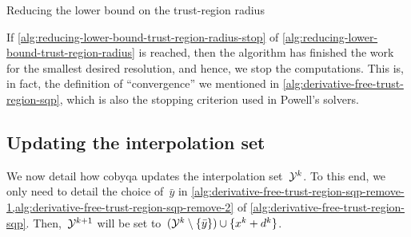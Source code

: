 \begin{algorithm}
    \caption{Reducing the lower bound on the trust-region radius}
    \label{alg:reducing-lower-bound-trust-region-radius}
    \DontPrintSemicolon
    \onehalfspacing
\end{algorithm}

If \cref{alg:reducing-lower-bound-trust-region-radius-stop} of \cref{alg:reducing-lower-bound-trust-region-radius} is reached, then the algorithm has finished the work for the smallest desired resolution, and hence, we stop the computations.
This is, in fact, the definition of \enquote{convergence} we mentioned in \cref{alg:derivative-free-trust-region-sqp}, which is also the stopping criterion used in Powell's solvers.

\subsection{Updating the interpolation set}

We now detail how \gls{cobyqa} updates the interpolation set~$\xpt[k]$.
To this end, we only need to detail the choice of~$\bar{y}$ in \cref{alg:derivative-free-trust-region-sqp-remove-1,alg:derivative-free-trust-region-sqp-remove-2} of \cref{alg:derivative-free-trust-region-sqp}.
Then,~$\xpt[k + 1]$ will be set to~$(\xpt[k] \setminus \set{\bar{y}}) \cup \set{\iter[k] + \step[k]}$.

